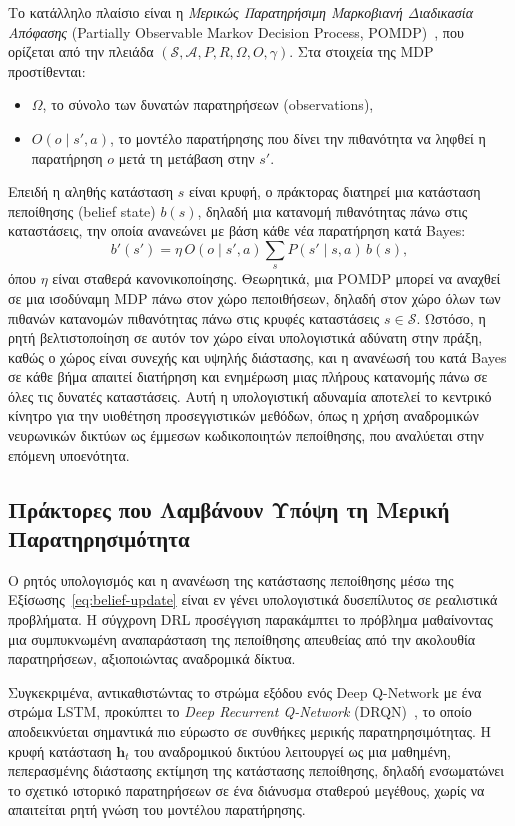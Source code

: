 Το κατάλληλο πλαίσιο είναι η \emph{Μερικώς Παρατηρήσιμη Μαρκοβιανή Διαδικασία
Απόφασης} (Partially Observable Markov Decision
Process, POMDP)~\cite{kaelbling1998pomdp}, που ορίζεται από την πλειάδα
$(\mathcal{S}, \mathcal{A}, P, R, \Omega, O, \gamma)$. Στα στοιχεία της MDP
προστίθενται:
\begin{itemize}
    \item $\Omega$, το σύνολο των δυνατών παρατηρήσεων
    (observations),
    \item $O(o \mid s', a)$, το μοντέλο παρατήρησης που δίνει την πιθανότητα
    να ληφθεί η παρατήρηση $o$ μετά τη μετάβαση στην $s'$.
\end{itemize}
Επειδή η αληθής κατάσταση $s$ είναι κρυφή, ο πράκτορας διατηρεί μια
κατάσταση πεποίθησης (belief state) $b(s)$,
δηλαδή μια κατανομή πιθανότητας πάνω στις καταστάσεις, την οποία ανανεώνει με
βάση κάθε νέα παρατήρηση κατά Bayes:
\begin{equation}
    b'(s') = \eta\, O(o \mid s', a)
    \sum_{s} P(s' \mid s, a)\, b(s),
    \label{eq:belief-update}
\end{equation}
όπου $\eta$ είναι σταθερά κανονικοποίησης. Θεωρητικά, μια POMDP μπορεί να
αναχθεί σε μια ισοδύναμη MDP πάνω στον χώρο πεποιθήσεων, δηλαδή στον
χώρο όλων των πιθανών κατανομών πιθανότητας πάνω στις κρυφές καταστάσεις $s
\in \mathcal{S}$. Ωστόσο, η ρητή βελτιστοποίηση σε αυτόν τον χώρο είναι
υπολογιστικά αδύνατη στην πράξη, καθώς ο χώρος είναι συνεχής και υψηλής
διάστασης, και η ανανέωσή του κατά Bayes σε κάθε βήμα απαιτεί διατήρηση και
ενημέρωση μιας πλήρους κατανομής πάνω σε όλες τις δυνατές καταστάσεις. Αυτή η
υπολογιστική αδυναμία αποτελεί το κεντρικό κίνητρο για την υιοθέτηση
προσεγγιστικών μεθόδων, όπως η χρήση αναδρομικών νευρωνικών δικτύων ως
έμμεσων κωδικοποιητών πεποίθησης, που αναλύεται στην επόμενη
υποενότητα.


\subsection{Πράκτορες που Λαμβάνουν Υπόψη τη Μερική Παρατηρησιμότητα}
\label{subsec:pomdp-agents}

Ο ρητός υπολογισμός και η ανανέωση της κατάστασης πεποίθησης μέσω της
Εξίσωσης~\eqref{eq:belief-update} είναι εν γένει υπολογιστικά δυσεπίλυτος σε
ρεαλιστικά προβλήματα. Η σύγχρονη DRL προσέγγιση παρακάμπτει το πρόβλημα
μαθαίνοντας μια συμπυκνωμένη αναπαράσταση της πεποίθησης απευθείας από
την ακολουθία παρατηρήσεων, αξιοποιώντας αναδρομικά δίκτυα.

Συγκεκριμένα, αντικαθιστώντας το στρώμα εξόδου ενός
Deep Q-Network με ένα στρώμα LSTM, προκύπτει το
\emph{Deep Recurrent Q-Network}
(DRQN)~\cite{hausknecht2015drqn}, το οποίο
αποδεικνύεται σημαντικά πιο εύρωστο σε συνθήκες μερικής παρατηρησιμότητας. Η
κρυφή κατάσταση $\mathbf{h}_t$ του αναδρομικού δικτύου λειτουργεί ως μια
μαθημένη, πεπερασμένης διάστασης εκτίμηση της κατάστασης πεποίθησης, δηλαδή
ενσωματώνει το σχετικό ιστορικό παρατηρήσεων σε ένα διάνυσμα σταθερού μεγέθους,
χωρίς να απαιτείται ρητή γνώση του μοντέλου παρατήρησης.

